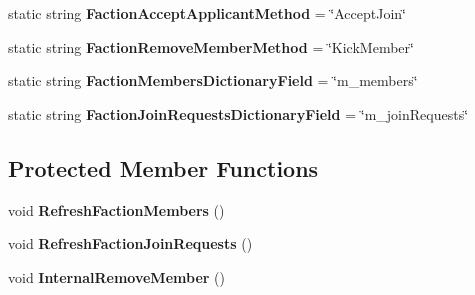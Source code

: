 \begin{DoxyCompactItemize}
\item 
\hypertarget{class_s_e_mod_a_p_i_internal_1_1_a_p_i_1_1_common_1_1_faction_aa75e4f11669a63a508fc997395fc74fb}{}static string {\bfseries Faction\+Accept\+Applicant\+Method} = \char`\"{}Accept\+Join\char`\"{}\label{class_s_e_mod_a_p_i_internal_1_1_a_p_i_1_1_common_1_1_faction_aa75e4f11669a63a508fc997395fc74fb}

\item 
\hypertarget{class_s_e_mod_a_p_i_internal_1_1_a_p_i_1_1_common_1_1_faction_ab5e1ce9dd2c86ab534c5e9e168f68a52}{}static string {\bfseries Faction\+Remove\+Member\+Method} = \char`\"{}Kick\+Member\char`\"{}\label{class_s_e_mod_a_p_i_internal_1_1_a_p_i_1_1_common_1_1_faction_ab5e1ce9dd2c86ab534c5e9e168f68a52}

\item 
\hypertarget{class_s_e_mod_a_p_i_internal_1_1_a_p_i_1_1_common_1_1_faction_a99af5ed6accd0b4ce7ef37129b17d6ce}{}static string {\bfseries Faction\+Members\+Dictionary\+Field} = \char`\"{}m\+\_\+members\char`\"{}\label{class_s_e_mod_a_p_i_internal_1_1_a_p_i_1_1_common_1_1_faction_a99af5ed6accd0b4ce7ef37129b17d6ce}

\item 
\hypertarget{class_s_e_mod_a_p_i_internal_1_1_a_p_i_1_1_common_1_1_faction_a88703b61825421859d79c125e308099a}{}static string {\bfseries Faction\+Join\+Requests\+Dictionary\+Field} = \char`\"{}m\+\_\+join\+Requests\char`\"{}\label{class_s_e_mod_a_p_i_internal_1_1_a_p_i_1_1_common_1_1_faction_a88703b61825421859d79c125e308099a}

\end{DoxyCompactItemize}
\subsection*{Protected Member Functions}
\begin{DoxyCompactItemize}
\item 
\hypertarget{class_s_e_mod_a_p_i_internal_1_1_a_p_i_1_1_common_1_1_faction_aa7c99dddf66b26035e25f15cb49e22fa}{}void {\bfseries Refresh\+Faction\+Members} ()\label{class_s_e_mod_a_p_i_internal_1_1_a_p_i_1_1_common_1_1_faction_aa7c99dddf66b26035e25f15cb49e22fa}

\item 
\hypertarget{class_s_e_mod_a_p_i_internal_1_1_a_p_i_1_1_common_1_1_faction_a98108fd313746065dce200e89b4c5385}{}void {\bfseries Refresh\+Faction\+Join\+Requests} ()\label{class_s_e_mod_a_p_i_internal_1_1_a_p_i_1_1_common_1_1_faction_a98108fd313746065dce200e89b4c5385}

\item 
\hypertarget{class_s_e_mod_a_p_i_internal_1_1_a_p_i_1_1_common_1_1_faction_a1e5e4d3039359c6c141c55971d31c023}{}void {\bfseries Internal\+Remove\+Member} ()\label{class_s_e_mod_a_p_i_internal_1_1_a_p_i_1_1_common_1_1_faction_a1e5e4d3039359c6c141c55971d31c023}

\end{DoxyCompactItemize}
